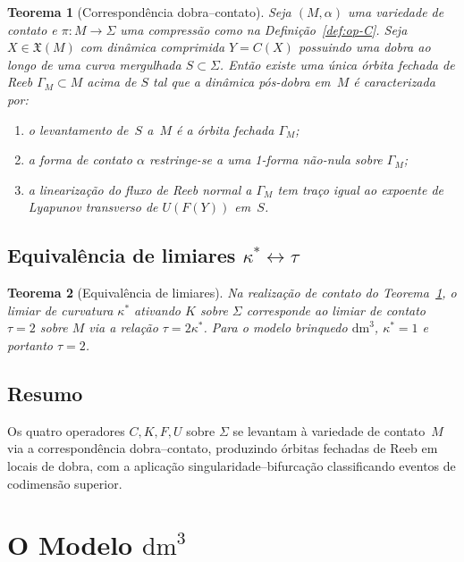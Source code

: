 \documentclass[12pt,a4paper,twoside]{book}
\theoremstyle{plain}
\newtheorem{teorema}{Teorema}[section]
\theoremstyle{definition}
\theoremstyle{definition}
\newcommand{\dm}{\mathrm{dm}^{3}}
\begin{document}
\begin{teorema}[Correspondência dobra--contato]\label{thm:dobra-contato}
Seja $(M,\alpha)$ uma variedade de contato e $\pi : M \to \Sigma$ uma
compressão como na Definição~\ref{def:op-C}. Seja $X \in \mathfrak{X}(M)$
com dinâmica comprimida $Y = C(X)$ possuindo uma dobra ao longo de uma
curva mergulhada $S \subset \Sigma$. Então existe uma única órbita
fechada de Reeb $\Gamma_{M} \subset M$ acima de $S$ tal que a dinâmica
pós-dobra em~$M$ é caracterizada por:
\begin{enumerate}[label=\textup{(\arabic*)}]
  \item o levantamento de~$S$ a~$M$ é a órbita fechada $\Gamma_{M}$;
  \item a forma de contato $\alpha$ restringe-se a uma 1-forma não-nula
        sobre $\Gamma_{M}$;
  \item a linearização do fluxo de Reeb normal a $\Gamma_{M}$ tem traço
        igual ao expoente de Lyapunov transverso de $U(F(Y))$ em~$S$.
\end{enumerate}
\end{teorema}

\section{Equivalência de limiares $\kappa^{\ast} \leftrightarrow \tau$}

\begin{teorema}[Equivalência de limiares]\label{thm:equi-limiar}
Na realização de contato do Teorema~\ref{thm:dobra-contato}, o limiar de
curvatura $\kappa^{\ast}$ ativando $K$ sobre $\Sigma$ corresponde ao
limiar de contato $\tau = 2$ sobre $M$ via a relação $\tau = 2\kappa^{\ast}$.
Para o modelo brinquedo $\dm$, $\kappa^{\ast} = 1$ e portanto $\tau = 2$.
\end{teorema}

\section{Resumo}

Os quatro operadores $C, K, F, U$ sobre $\Sigma$ se levantam à variedade
de contato~$M$ via a correspondência dobra--contato, produzindo órbitas
fechadas de Reeb em locais de dobra, com a aplicação singularidade--bifurcação
classificando eventos de codimensão superior.

\chapter{O Modelo $\dm$}
\label{cap:dm3}
\end{document}
